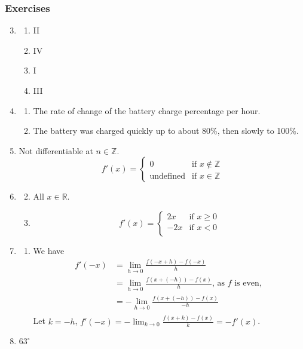 \documentclass{article}
\begin{document}
\subsubsection*{Exercises}
\begin{enumerate}
    \setcounter{enumi}{2}
  \item
    \begin{enumerate}
      \item II
      \item IV
      \item I
      \item III
    \end{enumerate}
    \setcounter{enumi}{12}
  \item
    \begin{enumerate}
      \item The rate of change of the battery charge percentage per hour.
      \item The battery was charged quickly up to about 80\%, then slowly to 100\%.
    \end{enumerate}
    \setcounter{enumi}{57}
  \item Not differentiable at $n\in\mathbb{Z}$.
    \[f'(x)=
      \begin{cases}
        0 & \text{if } x\notin\mathbb{Z} \\
        \text{undefined} & \text{if } x\in\mathbb{Z}
    \end{cases}\]
  \item
    \begin{enumerate}
        \setcounter{enumii}{1}
      \item All $x\in\mathbb{R}$.
      \item \[f'(x)=
          \begin{cases}
            2x & \text{if } x\ge0 \\
            -2x & \text{if } x<0 \\
        \end{cases}\]
    \end{enumerate}
    \setcounter{enumi}{60}
  \item
    \begin{enumerate}
      \item We have
        \begin{align*}
          f'(-x) & = \lim_{h\to0}\frac{f(-x+h)-f(-x)}{h} \\
          & = \lim_{h\to0}\frac{f(x+(-h))-f(x)}{h} \text{, as $f$ is even, }\\
          & = -\lim_{h\to0}\frac{f(x+(-h))-f(x)}{-h} \\
        \end{align*}
        Let $k=-h$, $f'(-x)=-\lim_{k\to0}\frac{f(x+k)-f(x)}{k}=-f'(x)$.
    \end{enumerate}
    \setcounter{enumi}{64}
  \item $63^\circ$
\end{enumerate}
\end{document}
